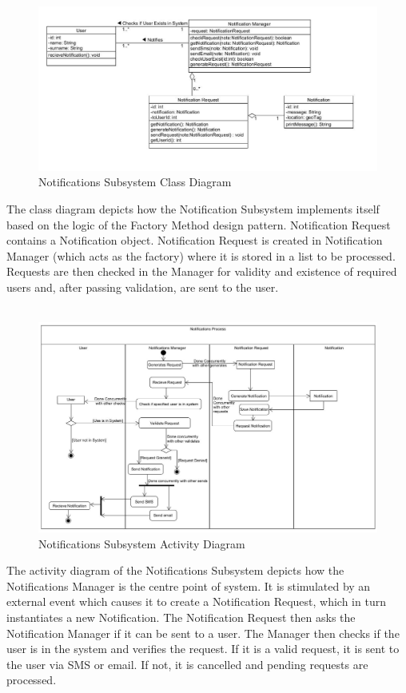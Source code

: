 \documentclass{article}
\begin{document}
				\begin{figure}[h!]
					\includegraphics[scale=0.5]{Diagrams/Class_Diagram_Notifications.JPG}
					\caption{Notifications Subsystem Class Diagram}	
				\end{figure}
				{The class diagram depicts how the Notification Subsystem implements itself based on the logic of the Factory Method design pattern. Notification Request contains a Notification object. Notification Request is created in Notification Manager (which acts as the factory) where it is stored in a list to be processed. Requests are then checked in the Manager for validity and existence of required users and, after passing validation, are sent to the user.\\\\}
			
				\begin{figure}[h!]
					\includegraphics[scale=0.5]{Diagrams/Activity_Diagram_Notifications.JPG}
					\caption{Notifications Subsystem Activity Diagram}	
				\end{figure}
				{The activity diagram of the Notifications Subsystem depicts how the Notifications Manager is the centre point of system. It is stimulated by an external event which causes it to create a Notification Request, which in turn instantiates a new Notification. The Notification Request then asks the Notification Manager if it can be sent to a user. The Manager then checks if the user is in the system and verifies the request. If it is a valid request, it is sent to the user via SMS or email. If not, it is cancelled and pending requests are processed.\\\\}
				
\end{document}
